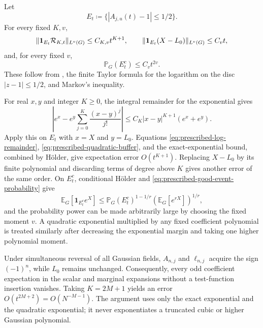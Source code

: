 \documentclass[11pt,reqno]{amsart}
\numberwithin{equation}{section}
\theoremstyle{plain}
\theoremstyle{definition}
\DeclarePairedDelimiter{\norm}{\lVert}{\rVert}
\newcommand{\E}{\mathbb E}
\newcommand{\Pb}{\mathbb P}
\newcommand{\one}{\mathbf 1}
\begin{document}
Let
\begin{equation}
 E_t\coloneqq\{|A_{j,u}(t)-1|\leq1/2\}.
 \label{eq:prescribed-good-event}
\end{equation}
For every fixed $K,v$,
\begin{equation}
 \norm{\one_{E_t}\mathcal R_{K,t}}_{L^v(G)}\leq C_{K,v}t^{K+1},
 \qquad
 \norm{\one_{E_t}(X-L_0)}_{L^v(G)}\leq C_vt,
 \label{eq:prescribed-log-remainder}
\end{equation}
and, for every fixed $v$,
\begin{equation}
 \Pb_G(E_t^c)\leq C_vt^{2v}.
 \label{eq:prescribed-good-event-probability}
\end{equation}
These follow from , the finite Taylor formula for the logarithm on the disc $|z-1|\leq1/2$, and Markov's inequality.

For real $x,y$ and integer $K\geq0$, the integral remainder for the exponential gives
\begin{equation}
 \left|e^x-e^y\sum_{j=0}^K\frac{(x-y)^j}{j!}\right|
 \leq C_K|x-y|^{K+1}(e^x+e^y).
 \label{eq:prescribed-global-exponential-remainder}
\end{equation}
Apply this on $E_t$ with $x=X$ and $y=L_0$.  Equations \eqref{eq:prescribed-log-remainder}, \eqref{eq:prescribed-quadratic-buffer}, and the exact-exponential bound, combined by H\"older, give expectation error $O(t^{K+1})$.  Replacing $X-L_0$ by its finite polynomial and discarding terms of degree above $K$ gives another error of the same order.  On $E_t^c$, conditional H\"older and \eqref{eq:prescribed-good-event-probability} give
\begin{equation}
 \E_G[\one_{E_t^c}e^X]
 \leq \Pb_G(E_t^c)^{1-1/r}(\E_G[e^{rX}])^{1/r},
 \label{eq:prescribed-bad-event-bound}
\end{equation}
and the probability power can be made arbitrarily large by choosing the fixed moment $v$.  A quadratic exponential multiplied by any fixed coefficient polynomial is treated similarly after decreasing the exponential margin and taking one higher polynomial moment.

Under simultaneous reversal of all Gaussian fields, $A_{n,j}$ and $\ell_{n,j}$ acquire the sign $(-1)^n$, while $L_0$ remains unchanged.  Consequently, every odd coefficient expectation in the scalar and marginal expansions without a test-function insertion vanishes.  Taking $K=2M+1$ yields an error $O(t^{2M+2})=O(N^{-M-1})$.  The argument uses only the exact exponential and the quadratic exponential; it never exponentiates a truncated cubic or higher Gaussian polynomial.
\end{document}
